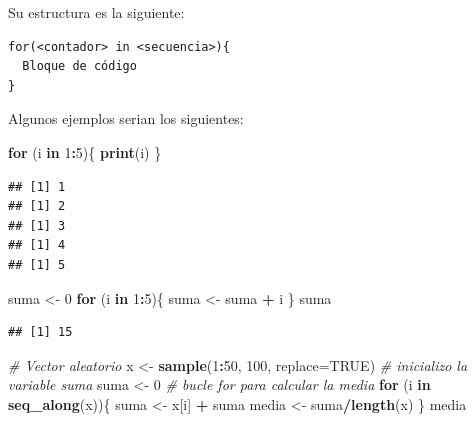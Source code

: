 \documentclass[11pt,]{article}
\newenvironment{Shaded}{\begin{snugshade}}{\end{snugshade}}
\newcommand{\CommentTok}[1]{\textcolor[rgb]{0.56,0.35,0.01}{\textit{#1}}}
\newcommand{\ControlFlowTok}[1]{\textcolor[rgb]{0.13,0.29,0.53}{\textbf{#1}}}
\newcommand{\DataTypeTok}[1]{\textcolor[rgb]{0.13,0.29,0.53}{#1}}
\newcommand{\DecValTok}[1]{\textcolor[rgb]{0.00,0.00,0.81}{#1}}
\newcommand{\KeywordTok}[1]{\textcolor[rgb]{0.13,0.29,0.53}{\textbf{#1}}}
\newcommand{\NormalTok}[1]{#1}
\newcommand{\OperatorTok}[1]{\textcolor[rgb]{0.81,0.36,0.00}{\textbf{#1}}}
\newcommand{\OtherTok}[1]{\textcolor[rgb]{0.56,0.35,0.01}{#1}}
\newcommand{\StringTok}[1]{\textcolor[rgb]{0.31,0.60,0.02}{#1}}
\begin{document}
Su estructura es la siguiente:

\begin{verbatim}
for(<contador> in <secuencia>){
  Bloque de código
}
\end{verbatim}

Algunos ejemplos serian los siguientes:

\begin{Shaded}
\begin{Highlighting}[]
\ControlFlowTok{for}\NormalTok{ (i }\ControlFlowTok{in} \DecValTok{1}\OperatorTok{:}\DecValTok{5}\NormalTok{)\{}
  \KeywordTok{print}\NormalTok{(i)}
\NormalTok{\}}
\end{Highlighting}
\end{Shaded}

\begin{verbatim}
## [1] 1
## [1] 2
## [1] 3
## [1] 4
## [1] 5
\end{verbatim}

\begin{Shaded}
\begin{Highlighting}[]
\NormalTok{suma <-}\StringTok{ }\DecValTok{0}
\ControlFlowTok{for}\NormalTok{ (i }\ControlFlowTok{in} \DecValTok{1}\OperatorTok{:}\DecValTok{5}\NormalTok{)\{}
\NormalTok{  suma <-}\StringTok{ }\NormalTok{suma }\OperatorTok{+}\StringTok{ }\NormalTok{i}
\NormalTok{\}}
\NormalTok{suma}
\end{Highlighting}
\end{Shaded}

\begin{verbatim}
## [1] 15
\end{verbatim}

\begin{Shaded}
\begin{Highlighting}[]
\CommentTok{# Vector aleatorio}
\NormalTok{x <-}\StringTok{ }\KeywordTok{sample}\NormalTok{(}\DecValTok{1}\OperatorTok{:}\DecValTok{50}\NormalTok{, }\DecValTok{100}\NormalTok{, }\DataTypeTok{replace=}\OtherTok{TRUE}\NormalTok{)}
\CommentTok{# inicializo la variable suma}
\NormalTok{suma <-}\StringTok{ }\DecValTok{0}
\CommentTok{# bucle for para calcular la media}
\ControlFlowTok{for}\NormalTok{ (i }\ControlFlowTok{in} \KeywordTok{seq_along}\NormalTok{(x))\{}
\NormalTok{  suma <-}\StringTok{ }\NormalTok{x[i] }\OperatorTok{+}\StringTok{ }\NormalTok{suma}
\NormalTok{  media <-}\StringTok{ }\NormalTok{suma}\OperatorTok{/}\KeywordTok{length}\NormalTok{(x)}
\NormalTok{\}}
\NormalTok{media}
\end{Highlighting}
\end{Shaded}
\end{document}
